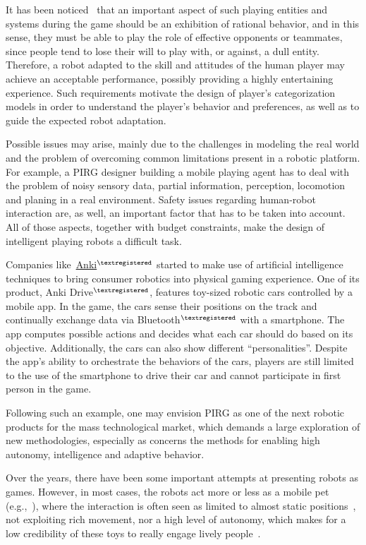 It has been noticed~\cite{martinoia_physically_2013, bonarini_timing_2014} that an important aspect of such playing entities and systems during the game should be an exhibition of rational behavior, and in this sense, they must be able to play the role of effective opponents or teammates, since people tend to lose their will to play with, or against, a dull entity. Therefore, a robot adapted to the skill and attitudes of the human player may achieve an acceptable performance, possibly providing a highly entertaining experience. Such requirements motivate the design of player's categorization models in order to understand the player's behavior and preferences, as well as to guide the expected robot adaptation. 

Possible issues may arise, mainly due to the challenges in modeling the real world and the problem of overcoming common limitations present in a robotic platform. For example, a PIRG designer building a mobile playing agent has to deal with the problem of noisy sensory data, partial information, perception, locomotion and planing in a real environment. Safety issues regarding human-robot interaction are, as well, an important factor that has to be taken into account. All of those aspects, together with budget constraints, make the design of intelligent playing robots a difficult task.

Companies like~\href{https://anki.com/en-us}{Anki$^{\tiny{\textregistered}}$} started to make use of artificial intelligence techniques to bring consumer robotics into physical gaming experience. One of its product, Anki Drive$^{\tiny{\textregistered}}$, features toy-sized robotic cars controlled by a mobile app. In the game, the cars sense their positions on the track and continually exchange data via Bluetooth$^{\tiny{\textregistered}}$ with a smartphone. The app computes possible actions and decides what each car should do based on its objective. Additionally, the cars can also show different ``personalities''. Despite the app's ability to orchestrate the behaviors of the cars, players are still limited to the use of the smartphone to drive their car and cannot participate in first person in the game.

Following such an example, one may envision PIRG as one of the next robotic products for the mass technological market, which demands a large exploration of new methodologies, especially as concerns the methods for enabling high autonomy, intelligence and adaptive behavior.

Over the years, there have been some important attempts at presenting robots as games. However, in most cases, the robots act more or less as a mobile pet (e.g.,~\cite{fujita_open_1997, brooks_robots_2004}), where the interaction is often seen as limited to almost static positions~\cite{yannakakis_entertainment_2008}, not exploiting rich movement, nor a high level of autonomy, which makes for a low credibility of these toys to really engage lively people~\cite{martinoia_physically_2013, bonarini_timing_2014}. 

